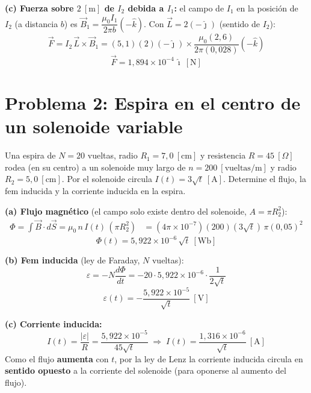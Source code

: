 \documentclass[12pt,letterpaper]{article}
\begin{document}
\medskip

\noindent\textbf{(c) Fuerza sobre $2\ [\text{m}]$ de $I_2$ debida a $I_1$:} el campo de $I_1$ en la
posici\'on de $I_2$ (a distancia $b$) es $\vec{B}_1 = \dfrac{\mu_0 I_1}{2\pi b}(-\hat{k})$. Con
$\vec{L} = 2(-\hat{\jmath})$ (sentido de $I_2$):
\[
    \vec{F} = I_2\,\vec{L}\times\vec{B}_1
            = (5{,}1)(2)(-\hat{\jmath})\times\frac{\mu_0(2{,}6)}{2\pi(0{,}028)}(-\hat{k})
\]
\[
    \boxed{\vec{F} = 1{,}894\times10^{-4}\,\hat{\imath}\ [\text{N}]}
\]

\newpage

\section*{Problema 2: Espira en el centro de un solenoide variable}

\noindent Una espira de $N = 20$ vueltas, radio $R_1 = 7{,}0\ [\text{cm}]$ y resistencia
$R = 45\ [\Omega]$ rodea (en su centro) a un solenoide muy largo de $n = 200\ [\text{vueltas/m}]$
y radio $R_2 = 5{,}0\ [\text{cm}]$. Por el solenoide circula $I(t) = 3\sqrt{t}\ [\text{A}]$.
Determine el flujo, la fem inducida y la corriente inducida en la espira.

\medskip

\noindent\textbf{(a) Flujo magn\'etico} (el campo solo existe dentro del solenoide,
$A = \pi R_2^2$):
\begin{align*}
    \Phi = \int \vec{B}\cdot d\vec{S} = \mu_0\,n\,I(t)\,(\pi R_2^2)
       &= (4\pi\times10^{-7})(200)(3\sqrt{t})\,\pi(0{,}05)^2
\end{align*}
\[
    \boxed{\Phi(t) = 5{,}922\times10^{-6}\,\sqrt{t}\ [\text{Wb}]}
\]

\noindent\textbf{(b) Fem inducida} (ley de Faraday, $N$ vueltas):
\[
    \varepsilon = -N\frac{d\Phi}{dt}
                = -20\cdot 5{,}922\times10^{-6}\cdot\frac{1}{2\sqrt{t}}
\]
\[
    \boxed{\varepsilon(t) = -\frac{5{,}922\times10^{-5}}{\sqrt{t}}\ [\text{V}]}
\]

\noindent\textbf{(c) Corriente inducida:}
\[
    I(t) = \frac{|\varepsilon|}{R} = \frac{5{,}922\times10^{-5}}{45\sqrt{t}}
    \;\Rightarrow\; \boxed{I(t) = \frac{1{,}316\times10^{-6}}{\sqrt{t}}\ [\text{A}]}
\]
Como el flujo \textbf{aumenta} con $t$, por la ley de Lenz la corriente inducida circula en
\textbf{sentido opuesto} a la corriente del solenoide (para oponerse al aumento del flujo).
\end{document}
